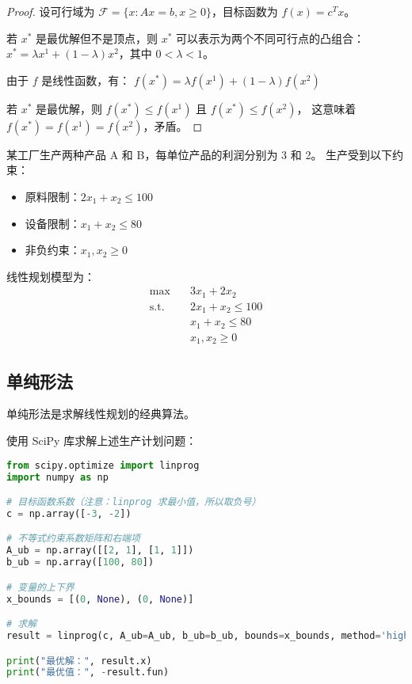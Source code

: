 \begin{proof}
设可行域为 $\mathcal{F} = \{x : Ax = b, x \geq 0\}$，目标函数为 $f(x) = c^T x$。

若 $x^*$ 是最优解但不是顶点，则 $x^*$ 可以表示为两个不同可行点的凸组合：
$x^* = \lambda x^1 + (1-\lambda) x^2$，其中 $0 < \lambda < 1$。

由于 $f$ 是线性函数，有：
$f(x^*) = \lambda f(x^1) + (1-\lambda) f(x^2)$

若 $x^*$ 是最优解，则 $f(x^*) \leq f(x^1)$ 且 $f(x^*) \leq f(x^2)$，
这意味着 $f(x^*) = f(x^1) = f(x^2)$，矛盾。
\end{proof}

\begin{examplebox}[title=生产计划问题]
某工厂生产两种产品 A 和 B，每单位产品的利润分别为 3 和 2。
生产受到以下约束：
\begin{itemize}
    \item 原料限制：$2x_1 + x_2 \leq 100$
    \item 设备限制：$x_1 + x_2 \leq 80$
    \item 非负约束：$x_1, x_2 \geq 0$
\end{itemize}

线性规划模型为：
\begin{align}
\max \quad & 3x_1 + 2x_2 \\
\text{s.t.} \quad & 2x_1 + x_2 \leq 100 \\
& x_1 + x_2 \leq 80 \\
& x_1, x_2 \geq 0
\end{align}
\end{examplebox}

\subsection{单纯形法}

单纯形法是求解线性规划的经典算法。

\begin{codebox}[title=Python 求解线性规划]
使用 SciPy 库求解上述生产计划问题：
\begin{lstlisting}[language=Python]
from scipy.optimize import linprog
import numpy as np

# 目标函数系数（注意：linprog 求最小值，所以取负号）
c = np.array([-3, -2])

# 不等式约束系数矩阵和右端项
A_ub = np.array([[2, 1], [1, 1]])
b_ub = np.array([100, 80])

# 变量的上下界
x_bounds = [(0, None), (0, None)]

# 求解
result = linprog(c, A_ub=A_ub, b_ub=b_ub, bounds=x_bounds, method='highs')

print("最优解：", result.x)
print("最优值：", -result.fun)
\end{lstlisting}
\end{codebox}

